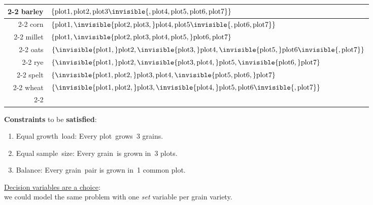 \documentclass{cons-beamer}
\newcommand{\VarSem}{sample}           \newcommand{\BlkSem}{growth}
\newcommand{\Variety}{grain}           \newcommand{\Block}{\textnormal{plot}}
\newcommand{\VarBlk}{grown in}         \newcommand{\BlkVar}{grows}
\newcommand{\VarOne}{barley}           \newcommand{\BlkOne}{\Block1}
\newcommand{\VarTwo}{corn}             \newcommand{\BlkTwo}{\Block2}
\newcommand{\VarThree}{millet}         \newcommand{\BlkThree}{\Block3}
\newcommand{\VarFour}{oats}            \newcommand{\BlkFour}{\Block4}
\newcommand{\VarFive}{rye}             \newcommand{\BlkFive}{\Block5}
\newcommand{\VarSix}{spelt}            \newcommand{\BlkSix}{\Block6}
\newcommand{\VarSeven}{wheat}          \newcommand{\BlkSeven}{\Block7}
\begin{document}
\begin{frame}
  \begin{example}
    \begin{table}
      \begin{tabular}{r|l|}
        \cline{2-2}
        \VarOne   & $\Set{\BlkOne, \BlkTwo, \BlkThree \invisible{, \BlkFour, \BlkFive, \BlkSix, \BlkSeven}}$ \\ \cline{2-2}
        \VarTwo   & $\Set{\BlkOne, \invisible{\BlkTwo, \BlkThree,} \BlkFour, \BlkFive \invisible{, \BlkSix, \BlkSeven}}$ \\ \cline{2-2}
        \VarThree & $\Set{\BlkOne, \invisible{\BlkTwo, \BlkThree, \BlkFour, \BlkFive,} \BlkSix, \BlkSeven}$ \\ \cline{2-2}
        \VarFour  & $\Set{\invisible{\BlkOne,} \BlkTwo, \invisible{\BlkThree,} \BlkFour, \invisible{\BlkFive,} \BlkSix \invisible{, \BlkSeven}}$ \\ \cline{2-2}
        \VarFive  & $\Set{\invisible{\BlkOne,} \BlkTwo, \invisible{\BlkThree, \BlkFour,} \BlkFive, \invisible{\BlkSix,} \BlkSeven}$ \\ \cline{2-2}
        \VarSix   & $\Set{\invisible{\BlkOne, \BlkTwo,} \BlkThree, \BlkFour, \invisible{\BlkFive, \BlkSix,} \BlkSeven}$ \\ \cline{2-2}
        \VarSeven & $\Set{\invisible{\BlkOne, \BlkTwo,} \BlkThree, \invisible{\BlkFour,} \BlkFive, \BlkSix \invisible{, \BlkSeven}}$ \\
        \cline{2-2}
      \end{tabular}
    \end{table}
    \textbf{Constraints} to be \textbf{satisfied}:
    \begin{enumerate}
    \item Equal \BlkSem\ load: Every \Block\ \BlkVar\ 3 \Variety s.
    \item Equal \VarSem\ size: Every \Variety\ is \VarBlk\ 3 \Block s.
    \item Balance: Every \Variety\ pair is \VarBlk\ 1 common \Block.
    \end{enumerate}
  \end{example}

  \underline{Decision variables are a choice}: \\
  we could model the same problem with one \textit{set} variable per grain variety.
\end{frame}
\end{document}
